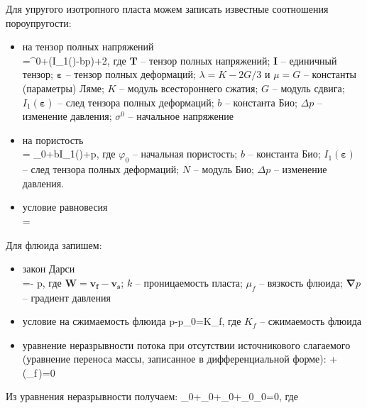 \documentclass[main.tex]{subfiles}
\begin{document}
Для упругого изотропного пласта можем записать известные соотношения пороупругости:
\begin{itemize}[parsep=-5pt]
\item на тензор полных напряжений \\
\beq
{}=\sigma^0+\left(\lambda I_1(\pmb{\varepsilon})-b\Delta p\right)+2\mu\pmb{\varepsilon},
\eeq
где $\pmb{T}$ -- тензор полных напряжений; $\pmb{I}$ -- единичный тензор; $\pmb{\varepsilon}$ -- тензор полных деформаций; $\lambda=K-2G/3$ и $\mu=G$ -- константы (параметры) Ляме; $K$ -- модуль всестороннего сжатия; $G$ -- модуль сдвига; $I_1(\pmb{\varepsilon})$ -- след тензора полных деформаций; $b$ -- константа Био; $\Delta p$ -- изменение давления; $\sigma^0$ -- начальное напряжение
\item на пористость \\
\beq
\varphi = \varphi_0+bI_1(\pmb{\varepsilon})+\Delta p,
\eeq
где $\varphi_0$ -- начальная пористость; $b$ -- константа Био; $I_1(\pmb{\varepsilon})$ -- след тензора полных деформаций; $N$ -- модуль Био; $\Delta p$ -- изменение давления.
\item условие равновесия \\
\beq
\pmb{\nabla}\cdot{}=
\eeq
\end{itemize}

Для флюида запишем:
\begin{itemize}[parsep=-5pt]
	\item закон Дарси \\
	\beq
	=-\cdot\pmb{\nabla} p,
	\eeq
	где $\pmb{W}=\pmb{v_f}-\pmb{v_s}$; $k$ -- проницаемость пласта; $\mu_f$ -- вязкость флюида; $\pmb{\nabla} p$ -- градиент давления
	\item условие на сжимаемость флюида
	\beq
	p-p_0=K_f,
	\eeq
	где $K_f$ -- сжимаемость флюида
	\item уравнение неразрывности потока при отсутствии источникового слагаемого (уравнение переноса массы, записанное в дифференциальной форме):
	\beq
	+\pmb{\nabla}\cdot\left(\rho_f\varphi\,\right)=0
	\eeq
\end{itemize}

Из уравнения неразрывности получаем:
\beq
\varphi_0+\rho_0+\rho_0\pmb{\nabla}\cdot{}+\rho_0\varphi_0=0,
\eeq
где
\beq
{}\equiv\pmb{\nabla}\cdot{}
\eeq
\end{document}
